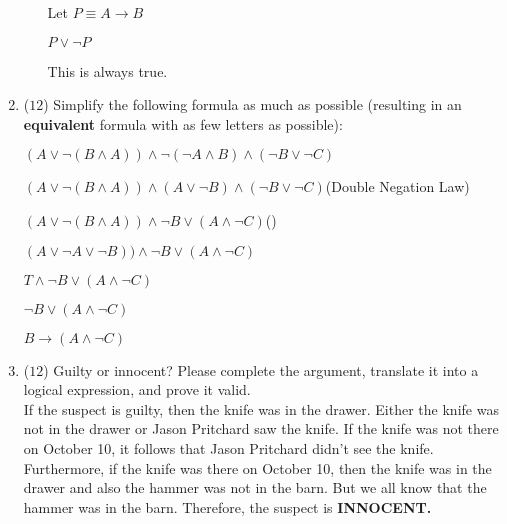 \documentclass[12pt]{article}
\begin{document}
\begin{enumerate}
\begin{enumerate}
Let $P \equiv A \to B$

$P \lor \lnot P$

This is always true.

\clearpage
\end{enumerate}

\item ($12$)
Simplify the following formula as much as possible (resulting in an \textbf{equivalent} formula with as few letters as possible):

 $(A \lor \lnot (B \land A)) \land \lnot(\lnot A \land B) \land (\lnot B \lor \lnot C)$

$(A \lor \lnot (B \land A)) \land  (A \lor \lnot B) \land (\lnot B \lor \lnot C)$\hfill(Double Negation Law)

$(A \lor \lnot (B \land A)) \land  \lnot B \lor (A \land \lnot C)$\hfill()

$(A \lor \lnot A\lor \lnot B)) \land  \lnot B \lor (A \land \lnot C)$

$T \land  \lnot B \lor (A \land \lnot C)$

$\lnot B \lor (A \land \lnot C)$

$B \to (A \land \lnot C)$


\clearpage

\item ($12$)
Guilty or innocent? Please complete the argument, translate it into a logical expression, and prove it valid. \\

If the suspect is guilty, then the knife was in the drawer. Either the knife was not in the drawer or Jason Pritchard saw the knife. If the knife was not there on October 10, it follows that Jason Pritchard didn’t see the knife. Furthermore, if the knife was there on October 10, then the knife was in the drawer and also the hammer was not in the barn. But we all know that the hammer was in the barn. Therefore, the suspect is  \textbf{INNOCENT.}


\end{enumerate}
\end{document}
